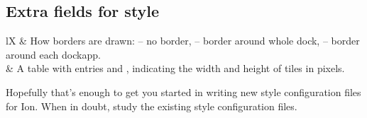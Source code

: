 \subsection{Extra fields for style }

\begin{tabularx}{\linewidth}{lX}
 & How borders are drawn:
			 -- no border,
			 -- border around whole dock,
			 -- border around each dockapp. \\
 & A table with entries  and ,
	indicating the width and height of tiles in pixels.
\end{tabularx}


Hopefully that's enough to get you started in writing new style
configuration files for Ion. When in doubt, study the existing
style configuration files.
